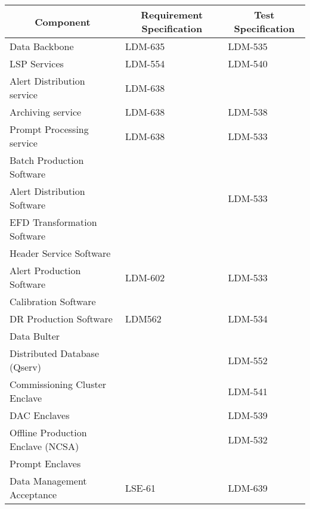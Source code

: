 \begin{longtable}{p{}|p{}|p{}}
\multicolumn{1}{c}{\textbf{Component}} & \multicolumn{1}{c}{\textbf{Requirement Specification}} &  \multicolumn{1}{c}{\textbf{Test Specification}} \\ \hline

Data Backbone                     & \cellcolor{dmorange} LDM-635 & \cellcolor{dmyellow} LDM-535 \\\hline
LSP Services                      &   \cellcolor{dmblue} LDM-554 &   \cellcolor{dmblue} LDM-540 \\\hline
Alert Distribution service        & \cellcolor{dmyellow} LDM-638 &                              \\\hline
Archiving service                 & \cellcolor{dmyellow} LDM-638 &   \cellcolor{dmblue} LDM-538 \\\hline
Prompt Processing service         & \cellcolor{dmyellow} LDM-638 &   \cellcolor{dmblue} LDM-533 \\\hline
Batch Production Software         &                              &                              \\\hline
Alert Distribution Software       &                              &   \cellcolor{dmblue} LDM-533 \\\hline
EFD Transformation Software       &                              &                              \\\hline
Header Service Software           &                              &                              \\\hline
Alert Production Software         &   \cellcolor{dmblue} LDM-602 &   \cellcolor{dmblue} LDM-533 \\\hline
Calibration Software              &                              &                              \\\hline
DR Production Software            &    \cellcolor{dmblue} LDM562 &   \cellcolor{dmblue} LDM-534 \\\hline
Data Bulter                       &                              &                              \\\hline
Distributed Database (Qserv)      &                              &   \cellcolor{dmblue} LDM-552 \\\hline
Commissioning Cluster Enclave     &                              & \cellcolor{dmyellow} LDM-541 \\\hline
DAC Enclaves                      &                              & \cellcolor{dmyellow} LDM-539 \\\hline
Offline Production Enclave (NCSA) &                              & \cellcolor{dmyellow} LDM-532 \\\hline
Prompt Enclaves                   &                              &                              \\\hline
Data Management Acceptance        &    \cellcolor{dmblue} LSE-61 & \cellcolor{dmorange} LDM-639 \\\hline


\end{longtable}
